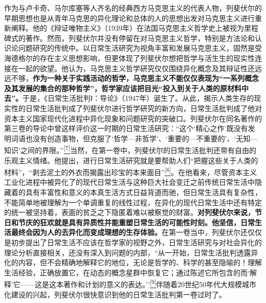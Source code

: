 \documentclass[UTF8, fontset = sourcesans, a4paper, oneside, zihao =
-4, scheme=chinese, no-math, space=true]{ctexbook}
\begin{document}
作为与卢卡奇、马尔库塞等人齐名的经典西方马克思主义的代表人物，列斐伏尔的早期思想也是从青年马克思的异化理论和总体的人的思想出发对马克思主义进行重新阐释。他的《辩证唯物主义》（1939年）在法国马克思主义哲学史上被视为里程碑式的著作。然而，列斐伏尔并没有停留在对马克思主义哲学，特别是方法论和认识论问题研究的传统中。以日常生活研究为视角丰富和发展马克思主义，固然是受海德格尔的存在主义思想影响，但更体现了列斐伏尔想把哲学与活生生的现实性连接在一起的欲望。他认为，马克思主义哲学研究仅仅围绕异化概念及其辩证性还远远不够，\textbf{作为一种关于实践活动的哲学，马克思主义不能仅仅表现为``一系列概念及其发展的集合的那种哲学''，哲学家应该把目光``投入到关于人类的原材料中去''。}于是，《日常生活批判Ⅰ：导论》（1947年）诞生了。从此，揭示人类生存的现实性的日常生活批判成了列斐伏尔进行哲学研究的新方向，日常生活批判成了他对资本主义国家现代化进程中异化现象和问题研究的突破口。列斐伏尔在同名著作的第三卷的导论中曾这样评价这一时期的日常生活研究：``这个`精心之作'既没有发明词语也没有创造事物，但克服了`哲学---非哲学'、`重要的---不重要的'、`无知---知识'之间的界限。''\protect\hypertarget{part0005_split_001.htmlux5cux23w7}{}{}\protect\hyperlink{part0005_split_003.htmlux5cux23m7}{\textsuperscript{{[}7{]}}}当然，在第一卷中，列斐伏尔的日常生活批判还带有自由的乐观主义情绪。他提出，进行日常生活研究就是要帮助人们``把握这些关于人类的材料''，``剥去泥土的外衣而揭露出珍宝的本来面目''\protect\hypertarget{part0005_split_001.htmlux5cux23w8}{}{}\protect\hyperlink{part0005_split_003.htmlux5cux23m8}{\textsuperscript{{[}8{]}}}。在他看来，尽管资本主义工业化进程中被异化了的现代日常生活与这种巨大社会变迁之前传统日常生活中隐藏着的具有丰富性和意义的本真生活方式日益背道而驰，但日常生活具有复杂性，不能简单地被理解为一个单调重复的线性过程，在异化的现代日常生活中还有特定的统一被坚持着，表面的贫乏之下隐匿着难以被察觉的财富。\textbf{对列斐伏尔来说，节日和节庆的狂欢就是具有异质性并能重塑日常生活的可能性时刻。他坚信，日常生活最终会因为人的去异化而变成理想的生存体验。}在第一卷当中，列斐伏尔还仅仅是初步提出了日常生活不应该在哲学家的视野之外，日常生活研究与对社会异化的理论分析直接相关，还没有深入到问题的内部，``从一开始，日常生活批判透露异化的内容，但不会精确地解释它的地位，无论是哲学的、科学的甚至隐喻的！理解生活经验，正确放置它，在动态的概念星群中恢复它；通过陈述它所包含的而`解释'它------这是这本著作和计划的意义的表达。''\protect\hypertarget{part0005_split_001.htmlux5cux23w9}{}{}\protect\hyperlink{part0005_split_003.htmlux5cux23m9}{\textsuperscript{{[}9{]}}}伴随着20世纪50年代大规模城市化建设的兴起，列斐伏尔很快意识到他的日常生活批判第一卷过时了。
\end{document}
